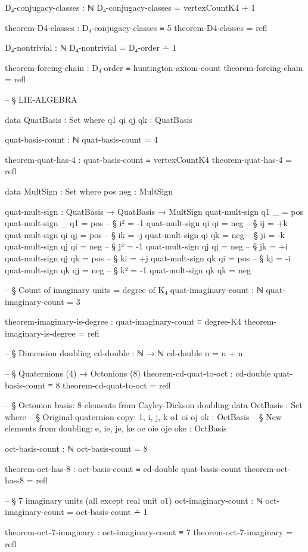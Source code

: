 \documentclass[11pt,a4paper]{book}
\begin{document}
\begin{code}
D₄-conjugacy-classes : ℕ
D₄-conjugacy-classes = vertexCountK4 + 1

theorem-D4-classes : D₄-conjugacy-classes ≡ 5
theorem-D4-classes = refl

D₄-nontrivial : ℕ
D₄-nontrivial = D₄-order ∸ 1

theorem-forcing-chain : D₄-order ≡ huntington-axiom-count
theorem-forcing-chain = refl


-- § LIE-ALGEBRA

data QuatBasis : Set where
  q1 qi qj qk : QuatBasis

quat-basis-count : ℕ
quat-basis-count = 4

theorem-quat-has-4 : quat-basis-count ≡ vertexCountK4
theorem-quat-has-4 = refl

data MultSign : Set where
  pos neg : MultSign

quat-mult-sign : QuatBasis → QuatBasis → MultSign
quat-mult-sign q1 _  = pos
quat-mult-sign _  q1 = pos
-- § i² = -1
quat-mult-sign qi qi = neg
-- § ij = +k
quat-mult-sign qi qj = pos
-- § ik = -j
quat-mult-sign qi qk = neg
-- § ji = -k
quat-mult-sign qj qi = neg
-- § j² = -1
quat-mult-sign qj qj = neg
-- § jk = +i
quat-mult-sign qj qk = pos
-- § ki = +j
quat-mult-sign qk qi = pos
-- § kj = -i
quat-mult-sign qk qj = neg
-- § k² = -1
quat-mult-sign qk qk = neg

-- § Count of imaginary units = degree of K₄
quat-imaginary-count : ℕ
quat-imaginary-count = 3

theorem-imaginary-is-degree : quat-imaginary-count ≡ degree-K4
theorem-imaginary-is-degree = refl

-- § Dimension doubling
cd-double : ℕ → ℕ
cd-double n = n + n

-- § Quaternions (4) → Octonions (8)
theorem-cd-quat-to-oct : cd-double quat-basis-count ≡ 8
theorem-cd-quat-to-oct = refl

-- § Octonion basis: 8 elements from Cayley-Dickson doubling
data OctBasis : Set where
  -- § Original quaternion copy: {1, i, j, k}
  o1 oi oj ok : OctBasis
  -- § New elements from doubling: {e, ie, je, ke}
  oe oie oje oke : OctBasis

oct-basis-count : ℕ
oct-basis-count = 8

theorem-oct-has-8 : oct-basis-count ≡ cd-double quat-basis-count
theorem-oct-has-8 = refl

-- § 7 imaginary units (all except real unit o1)
oct-imaginary-count : ℕ
oct-imaginary-count = oct-basis-count ∸ 1

theorem-oct-7-imaginary : oct-imaginary-count ≡ 7
theorem-oct-7-imaginary = refl


\end{code}
\end{document}

